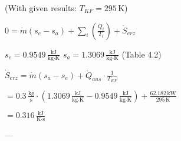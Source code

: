 (With given results: \( T_{KF} = 295 \, \text{K} \))  

\( 0 = \dot{m}(s_e - s_a) + \sum_i \left( \frac{\dot{Q}_i}{T_i} \right) + \dot{S}_{erz} \)  

\( s_e = 0.9549 \, \frac{\text{kJ}}{\text{kg·K}} \)  
\( s_a = 1.3069 \, \frac{\text{kJ}}{\text{kg·K}} \)  
(Table 4.2)  

\( \dot{S}_{erz} = \dot{m}(s_a - s_e) + \dot{Q}_{aus} \cdot \frac{1}{T_{KF}} \)  

\( = 0.3 \, \frac{\text{kg}}{\text{s}} \cdot \left( 1.3069 \, \frac{\text{kJ}}{\text{kg·K}} - 0.9549 \, \frac{\text{kJ}}{\text{kg·K}} \right) + \frac{62.182 \, \text{kW}}{295 \, \text{K}} \)  

\( = 0.316 \, \frac{\text{kJ}}{\text{K·s}} \)  

---